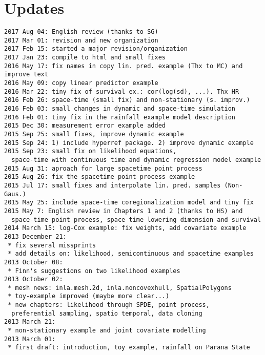 \section{Updates}
\begin{verbatim}
2017 Aug 04: English review (thanks to SG)
2017 Mar 01: revision and new organization
2017 Feb 15: started a major revision/organization
2017 Jan 23: compile to html and small fixes
2016 May 17: fix names in copy lin. pred. example (Thx to MC) and improve text
2016 May 09: copy linear predictor example
2016 Mar 22: tiny fix of survival ex.: cor(log(sd), ...). Thx HR
2016 Feb 26: space-time (small fix) and non-stationary (s. improv.)
2016 Feb 03: small changes in dynamic and space-time simulation
2016 Feb 01: tiny fix in the rainfall example model description
2015 Dec 30: measurement error example added 
2015 Sep 25: small fixes, improve dynamic example
2015 Sep 24: 1) include hyperref package. 2) improve dynamic example
2015 Sep 23: small fix on likelihood equations, 
  space-time with continuous time and dynamic regression model example
2015 Aug 31: aproach for large spacetime point process 
2015 Aug 26: fix the spacetime point process example  
2015 Jul 17: small fixes and interpolate lin. pred. samples (Non-Gaus.)
2015 May 25: include space-time coregionalization model and tiny fix
2015 May 7: English review in Chapters 1 and 2 (thanks to HS) and 
  space-time point process, space time lowering dimension and survival
2014 March 15: log-Cox example: fix weights, add covariate example
2013 December 21: 
 * fix several missprints
 * add details on: likelihood, semicontinuous and spacetime examples 
2013 October 08: 
 * Finn's suggestions on two likelihood examples 
2013 October 02:
 * mesh news: inla.mesh.2d, inla.noncovexhull, SpatialPolygons 
 * toy-example improved (maybe more clear...) 
 * new chapters: likelihood through SPDE, point process, 
  preferential sampling, spatio temporal, data cloning
2013 March 21:
 * non-stationary example and joint covariate modelling
2013 March 01: 
 * first draft: introduction, toy example, rainfall on Parana State
\end{verbatim}
